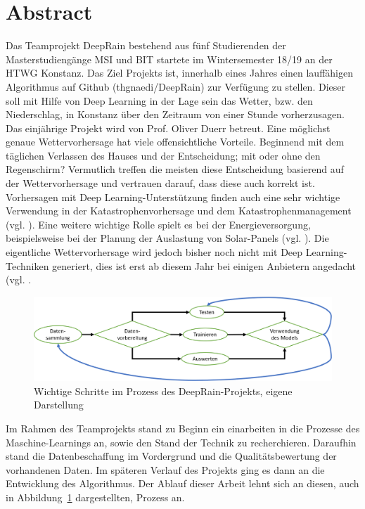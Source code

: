 \section{Abstract}
Das Teamprojekt DeepRain bestehend aus fünf Studierenden der Masterstudiengänge MSI und BIT startete im Wintersemester 18/19 an der HTWG Konstanz. Das Ziel Projekts ist, innerhalb eines Jahres einen lauffähigen Algorithmus auf Github (thgnaedi/DeepRain) zur Verfügung zu stellen. Dieser soll mit Hilfe von Deep Learning in der Lage sein das Wetter, bzw. den Niederschlag, in Konstanz über den Zeitraum von einer Stunde vorherzusagen. Das einjährige Projekt wird von Prof. Oliver Duerr betreut. 
Eine möglichst genaue Wettervorhersage hat viele offensichtliche Vorteile. Beginnend mit dem täglichen Verlassen des Hauses und der Entscheidung; mit oder ohne den Regenschirm? Vermutlich treffen die meisten diese Entscheidung basierend auf der Wettervorhersage und vertrauen darauf, dass diese auch korrekt ist.
Vorhersagen mit Deep Learning-Unterstützung finden auch eine sehr wichtige Verwendung in der Katastrophenvorhersage und dem Katastrophenmanagement (vgl. \cite[S. 763]{Hanif.2019}). Eine weitere wichtige Rolle spielt es bei der Energieversorgung, beispielsweise bei der Planung der Auslastung von Solar-Panels (vgl. \cite[S. 2]{AndreGensleret.al..}). Die eigentliche Wettervorhersage wird jedoch bisher noch nicht mit Deep Learning-Techniken generiert, dies ist erst ab diesem Jahr bei einigen Anbietern angedacht (vgl. \cite{ChristophFrohlich.2019}. 
\begin{figure}[ht]
\centering
\includegraphics[width=\linewidth]{pics/Deep_learning_prozess}
\caption{Wichtige Schritte im Prozess des DeepRain-Projekts, eigene Darstellung}
\label{fig:deepLearningProcess}
\end{figure}
Im Rahmen des Teamprojekts stand zu Beginn ein einarbeiten in die Prozesse des Maschine-Learnings an, sowie den Stand der Technik zu recherchieren. Daraufhin stand die Datenbeschaffung im Vordergrund und die Qualitätsbewertung der vorhandenen Daten. Im späteren Verlauf des Projekts ging es dann an die Entwicklung des Algorithmus. Der Ablauf dieser Arbeit lehnt sich an diesen, auch in Abbildung~\ref{fig:deepLearningProcess} dargestellten, Prozess an. 

